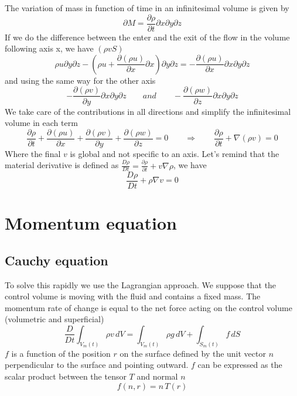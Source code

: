 			The variation of mass in function of time in an infinitesimal volume is given by 
			\begin{equation}
				\partial M = \frac{\partial \rho}{\partial t} \partial x \partial y \partial z
			\end{equation}
			If we do the difference between the enter and the exit of the flow in the volume following axis x, we have $(\rho v S)$
			\begin{equation}
				\rho u \partial y \partial z - \left( \rho u + \frac{\partial (\rho u)}{\partial x}\partial x \right) \partial y \partial z
				= - \frac{\partial (\rho u)}{\partial x}\partial x \partial y \partial z
			\end{equation}
			and using the same way for the other axis
			\begin{equation}
				- \frac{\partial (\rho v)}{\partial y}\partial x \partial y \partial z
				 \qquad and \qquad 
				- \frac{\partial (\rho w)}{\partial z}\partial x \partial y \partial z
			\end{equation}
			We take care of the contributions in all directions and simplify the infinitesimal volume in each term
			\begin{equation}
				\frac{\partial \rho}{\partial t} + \frac{\partial (\rho u)}{\partial x} + \frac{\partial (\rho v)}{\partial y} + \frac{\partial (\rho w)}{\partial z} = 0 
				\qquad \Rightarrow \qquad
				\frac{\partial \rho}{\partial t} + \nabla (\rho v) = 0
			\end{equation}
			Where the final $v$ is global and not specific to an axis. Let's remind that the material derivative is defined as $\frac{D\rho}{Dt} = \frac{\partial \rho}{\partial t} + v \nabla \rho$, we have
			\begin{equation}
				\frac{D\rho}{Dt} + \rho \nabla v = 0
			\end{equation}
			
\section{Momentum equation}
\subsection{Cauchy equation}
	To solve this rapidly we use the Lagrangian approach. We suppose that the control volume is moving with the fluid and contains a fixed mass. The momentum rate of change is equal to the net force acting on the control volume (volumetric and superficial)
	\begin{equation}
		\frac{D}{Dt} \int _{V_m(t)} \rho v \, dV = \int _{V_m(t)} \rho g \, dV + \int _{S_m(t)} f \, dS
		\label{eq:2.18}
	\end{equation}
	$f$ is a function of the position $r$ on the surface defined by the unit vector $n$ perpendicular to the surface and pointing outward. $f$ can be expressed as the scalar product between the tensor $T$ and normal $n$
	\begin{equation}
		f(n,r) = n\,T(r)
		\label{eq:2.19}
	\end{equation}
	
